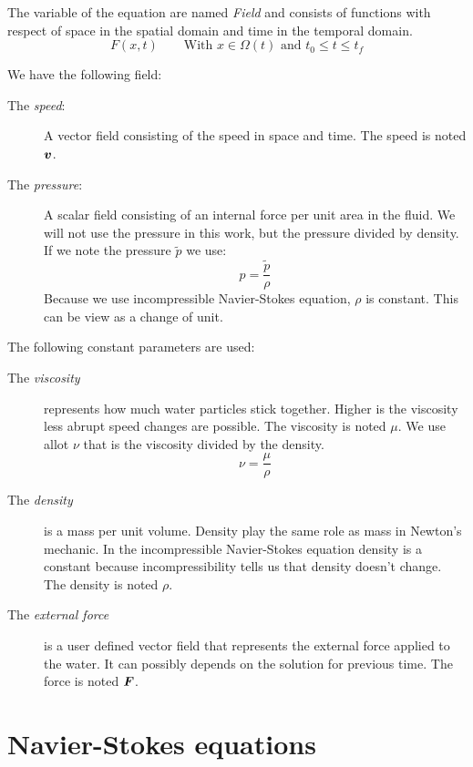 The variable of the equation are named \emph{Field} and consists of functions with respect of space in the spatial domain and time in the temporal domain.
\begin{equation}
 F(x,t)\qquad \text{With $x\in\Omega(t)$ and $t_0\leq t \leq t_f$}
\end{equation}

We have the following field:
\begin{description}
\item[The \emph{speed}:] A vector field consisting of the speed in space and time.
The speed is noted ${\boldsymbol {v}}$.
\item[The \emph{pressure}:] A scalar field consisting of an internal force per unit area in the fluid.
We will not use the pressure in this work, but the pressure divided by density.
If we note the pressure $\tilde{p}$ we use:
\begin{equation}
 p=\frac{\tilde{p}}{\rho}
\end{equation}
Because we use incompressible Navier-Stokes equation, $\rho$ is constant. This can be view as a change of unit.
\end{description}

The following constant parameters are used:
\begin{description}
\item[The \emph{viscosity}] represents how much water particles stick together.
Higher is the viscosity less abrupt speed changes are possible.
The viscosity is noted $\mu$. We use allot $\nu$ that is the viscosity divided by the density.
\begin{equation}
 \nu=\frac{\mu}{\rho}
\end{equation}
\item[The \emph{density}] is a mass per unit volume.
Density play the same role as mass in Newton's mechanic.
In the incompressible Navier-Stokes equation density is a constant because incompressibility tells us that density doesn't change.
The density is noted $\rho$.
\item[The \emph{external force}] is a user defined vector field that represents the external force applied to the water.
It can possibly depends on the solution for previous time.
The force is noted ${\boldsymbol {F}}$.
\end{description}

\section{Navier-Stokes equations}

